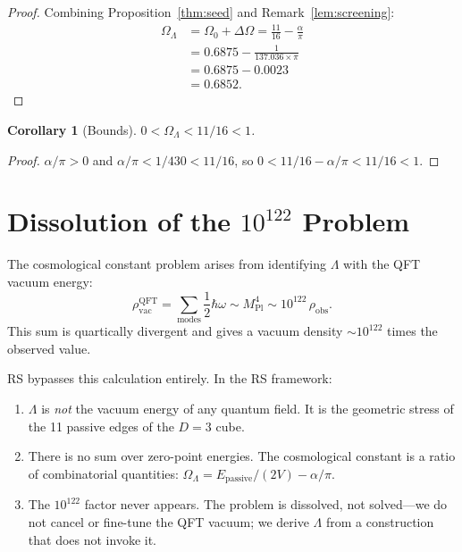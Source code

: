 \documentclass[12pt,a4paper]{article}
\newtheorem{corollary}[theorem]{Corollary}
\theoremstyle{definition}
\theoremstyle{remark}
\begin{document}
\begin{proof}
Combining Proposition~\ref{thm:seed} and Remark~\ref{lem:screening}:
\begin{align}
  \Omega_\Lambda &= \Omega_0 + \Delta\Omega
  = \frac{11}{16} - \frac{\alpha}{\pi} \\
  &= 0.6875 - \frac{1}{137.036 \times \pi} \\
  &= 0.6875 - 0.0023 \\
  &= 0.6852.
\end{align}
\end{proof}

\begin{corollary}[Bounds]
\label{cor:bounds}
$0 < \Omega_\Lambda < 11/16 < 1$.
\end{corollary}

\begin{proof}
$\alpha/\pi > 0$ and $\alpha/\pi < 1/430 < 11/16$, so
$0 < 11/16 - \alpha/\pi < 11/16 < 1$.
\end{proof}

\section{Dissolution of the $10^{122}$ Problem}
\label{sec:dissolution}

The cosmological constant problem arises from identifying
$\Lambda$ with the QFT vacuum energy:
\begin{equation}
  \rho_{\mathrm{vac}}^{\mathrm{QFT}} = \sum_{\text{modes}}
  \frac{1}{2}\hbar\omega \sim M_{\mathrm{Pl}}^4
  \sim 10^{122}\,\rho_{\mathrm{obs}}.
\end{equation}
This sum is quartically divergent and gives a vacuum density
$\sim 10^{122}$ times the observed value.

RS bypasses this calculation entirely.  In the RS framework:
\begin{enumerate}[label=(\roman*),nosep]
  \item $\Lambda$ is \emph{not} the vacuum energy of any quantum
  field.  It is the geometric stress of the 11 passive edges of
  the $D = 3$ cube.
  \item There is no sum over zero-point energies.  The
  cosmological constant is a ratio of combinatorial quantities:
  $\Omega_\Lambda = E_{\mathrm{passive}}/(2V) - \alpha/\pi$.
  \item The $10^{122}$ factor never appears.  The problem is
  dissolved, not solved---we do not cancel or fine-tune the QFT
  vacuum; we derive $\Lambda$ from a construction that does not
  invoke it.
\end{enumerate}
\end{document}
